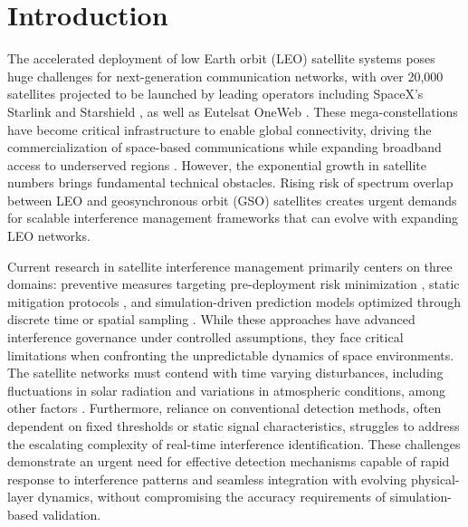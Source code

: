 \documentclass[conference]{IEEEtran}
\begin{document}
\section{Introduction}
\label{sec:intro}

The accelerated deployment of low Earth orbit (LEO) satellite systems poses huge challenges for next-generation communication networks, with over 20,000 satellites projected to be launched by leading operators including SpaceX's Starlink\cite{starlink} and Starshield \cite{spacex_starshield}, as well as Eutelsat OneWeb \cite{oneweb}. These mega-constellations have become critical infrastructure to enable global connectivity, driving the commercialization of space-based communications while expanding broadband access to underserved regions \cite{reddyLowEarthOrbit2023}. However, the exponential growth in satellite numbers brings fundamental technical obstacles. Rising risk of spectrum overlap between LEO and geosynchronous orbit (GSO) satellites creates urgent demands for scalable interference management frameworks that can evolve with expanding LEO networks.

Current research in satellite interference management primarily centers on three domains: preventive measures targeting pre-deployment risk minimization \cite{sharmaInlineInterferenceMitigation2016, liOptimalBeamPower2019}, static mitigation protocols \cite{wangCoFrequencyInterferenceAnalysis2020, zhangSpectralCoexistenceLEO2018}, and simulation-driven prediction models optimized through discrete time or spatial sampling \cite{wangCoFrequencyInterferenceAnalysis2020}. While these approaches have advanced interference governance under controlled assumptions, they face critical limitations when confronting the unpredictable dynamics of space environments. The satellite networks must contend with time varying disturbances, including fluctuations in solar radiation and variations in atmospheric conditions, among other factors \cite{facskoSpaceWeatherEffects2023}. Furthermore, reliance on conventional detection methods, often dependent on fixed thresholds or static signal characteristics, struggles to address the escalating complexity of real-time interference identification. These challenges demonstrate an urgent need for effective detection mechanisms capable of rapid response to interference patterns and seamless integration with evolving physical-layer dynamics, without compromising the accuracy requirements of simulation-based validation.
\end{document}
